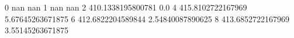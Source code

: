 0 nan nan
1 nan nan
2 410.1338195800781 0.0
4 415.8102722167969 5.67645263671875
6 412.6822204589844 2.54840087890625
8 413.6852722167969 3.55145263671875
